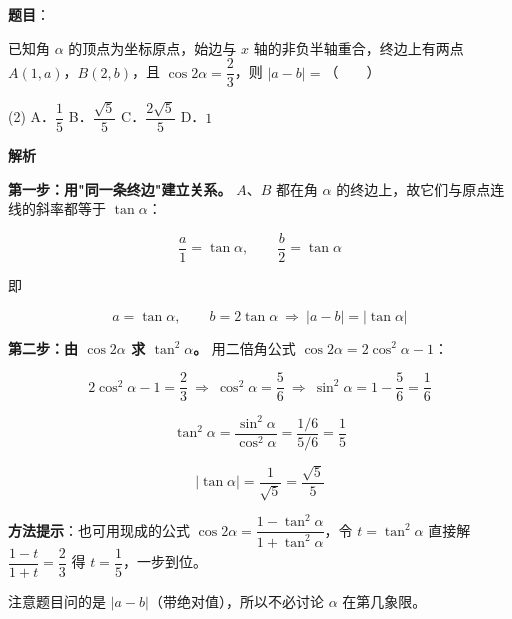 \begin{answer}

\textbf{题目}：

已知角 $\alpha$ 的顶点为坐标原点，始边与 $x$ 轴的非负半轴重合，终边上有两点 $A(1,a)$，$B(2,b)$，且 $\cos2\alpha=\dfrac23$，则 $|a-b|=$\mbox{（　　）}

\begin{gkopts}(2)
\task A．$\dfrac15$
\task B．$\dfrac{\sqrt5}5$
\task C．$\dfrac{2\sqrt5}5$
\task D．$1$
\end{gkopts}

\textbf{解析}

\textbf{第一步：用"同一条终边"建立关系。} $A$、$B$ 都在角 $\alpha$ 的终边上，故它们与原点连线的斜率都等于 $\tan\alpha$：

\nopagebreak[4]
\[\frac a1=\tan\alpha,\qquad \frac b2=\tan\alpha\]

即

\nopagebreak[4]
\[a=\tan\alpha,\qquad b=2\tan\alpha\ \Longrightarrow\ |a-b|=|\tan\alpha|\]

\textbf{第二步：由 $\cos2\alpha$ 求 $\tan^{2}\alpha$。} 用二倍角公式 $\cos2\alpha=2\cos^{2}\alpha-1$：

\nopagebreak[4]
\[2\cos^{2}\alpha-1=\frac23\ \Longrightarrow\ \cos^{2}\alpha=\frac56\ \Longrightarrow\ \sin^{2}\alpha=1-\frac56=\frac16\]

\nopagebreak[4]
\[\tan^{2}\alpha=\frac{\sin^{2}\alpha}{\cos^{2}\alpha}=\frac{1/6}{5/6}=\frac15\]

\nopagebreak[4]
\[|\tan\alpha|=\frac1{\sqrt5}=\frac{\sqrt5}5\]

\begin{gktip}
\textbf{方法提示}：也可用现成的公式 $\cos2\alpha=\dfrac{1-\tan^{2}\alpha}{1+\tan^{2}\alpha}$，令 $t=\tan^{2}\alpha$ 直接解 $\dfrac{1-t}{1+t}=\dfrac23$ 得 $t=\dfrac15$，一步到位。

注意题目问的是 $|a-b|$（带绝对值），所以不必讨论 $\alpha$ 在第几象限。
\end{gktip}


\par\medskip

\end{answer}
